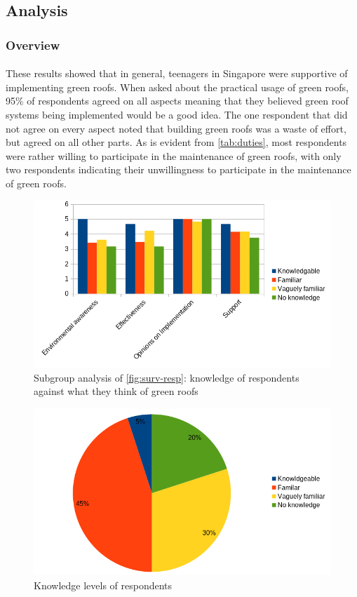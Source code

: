 \documentclass[a4paper]{article}
\begin{document}
\begin{multicols}{2}
  \subsection{Analysis}
  \subsubsection{Overview}
  \paragraph{} These results showed that in general, teenagers in
  Singapore were supportive of implementing green roofs. When asked
  about the practical usage of green roofs, 95\% of respondents agreed
  on all aspects meaning that they believed green roof systems being
  implemented would be a good idea. The one respondent that did not agree
  on every aspect noted that building green roofs was a waste of effort,
  but agreed on all other parts. As is evident from \cref{tab:duties},
  most respondents were rather willing to participate in the maintenance
  of green roofs, with only two respondents indicating their unwillingness
  to participate in the maintenance of green roofs.

  \begin{figure}[H]
    \centering
    \includegraphics[width=\linewidth]{knowledge-opinions.png}
    \caption{
      Subgroup analysis of \cref{fig:surv-resp}: knowledge of respondents
      against what they think of green roofs
    }
    \label{fig:know-opn}
  \end{figure}


  \begin{figure}[H]
    \centering
    \includegraphics[width=\linewidth]{knowledge.png}
    \caption{Knowledge levels of respondents}
    \label{fig:know-levels}
  \end{figure}

\end{multicols}
\end{document}

